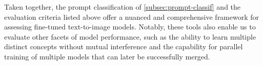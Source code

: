 Taken together, the prompt classification of \cref{subsec:prompt-classif} and the evaluation criteria listed above offer a nuanced and comprehensive framework for assessing fine-tuned text-to-image models.
Notably, these tools also enable us to evaluate other facets of model performance, such as the ability to learn multiple distinct concepts without mutual interference and the capability for parallel training of multiple models that can later be successfully merged.